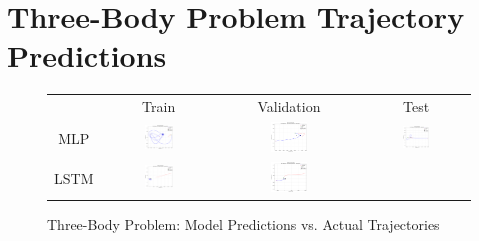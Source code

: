 \documentclass[12pt,a4paper]{article}
\begin{document}
\section{Three-Body Problem Trajectory Predictions}
\begin{figure}[H]
  \centering
  \caption{Three-Body Problem: Model Predictions vs. Actual Trajectories}
  \label{fig:three_body_predictions}
  \begin{tabular}{cccc}
      & Train & Validation & Test \\
      MLP &
      \includegraphics[width=0.27\textwidth]{../inference_results/train/MLP/three_body/500/full_trajectory_spaceship_0.png} &
      \includegraphics[width=0.27\textwidth]{../inference_results/val/MLP/three_body/500/full_trajectory_spaceship_0.png} &
      \includegraphics[width=0.27\textwidth]{../inference_results/test/MLP/three_body/500/full_trajectory_spaceship_0.png} \\
      LSTM &
      \includegraphics[width=0.27\textwidth]{../inference_results/train/LSTM/three_body/500/full_trajectory_spaceship_0.png} &
      \includegraphics[width=0.27\textwidth]{../inference_results/val/LSTM/three_body/500/full_trajectory_spaceship_0.png} &

\end{tabular}
\end{figure}
\end{document}

